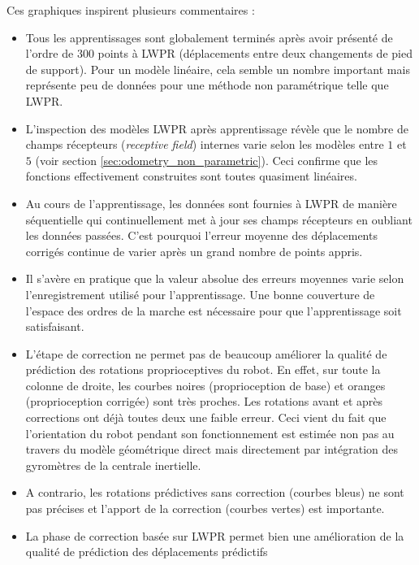 Ces graphiques inspirent plusieurs commentaires :
\begin{itemize}
    \item Tous les apprentissages sont globalement terminés après avoir 
        présenté de l'ordre de $300$ points à LWPR (déplacements entre 
        deux changements de pied de support). 
        Pour un modèle linéaire, cela semble un nombre important 
        mais représente peu de données pour une méthode non paramétrique telle que LWPR.
    \item L'inspection des modèles LWPR après apprentissage révèle que le nombre
        de champs récepteurs (\textit{receptive field}) internes varie 
        selon les modèles entre $1$ et $5$ (voir section \ref{sec:odometry_non_parametric}).
        Ceci confirme que les fonctions effectivement construites sont toutes quasiment linéaires.
    \item Au cours de l'apprentissage, les données sont fournies à LWPR de manière séquentielle
        qui continuellement met à jour ses champs récepteurs en oubliant les données passées.
        C'est pourquoi l'erreur moyenne des déplacements corrigés continue de varier après
        un grand nombre de points appris.
    \item Il s'avère en pratique que la valeur absolue des erreurs moyennes varie selon
        l'enregistrement utilisé pour l'apprentissage. Une bonne couverture de l'espace
        des ordres de la marche est nécessaire pour que l'apprentissage soit satisfaisant.
    \item L'étape de correction ne permet pas de beaucoup améliorer la qualité de prédiction
        des rotations proprioceptives du robot. 
        En effet, sur toute la colonne de droite, les courbes noires (proprioception de base) 
        et oranges (proprioception corrigée) sont très proches.
        Les rotations avant et après corrections ont déjà toutes deux une faible erreur.
        Ceci vient du fait que l'orientation du robot pendant son fonctionnement est estimée 
        non pas au travers du modèle géométrique direct mais directement par intégration 
        des gyromètres de la centrale inertielle.
    \item A contrario, les rotations prédictives sans correction (courbes bleus) 
        ne sont pas précises et l'apport de la correction (courbes vertes) est importante.
    \item La phase de correction basée sur LWPR permet bien
        une amélioration de la qualité de prédiction des déplacements prédictifs

\end{itemize}
